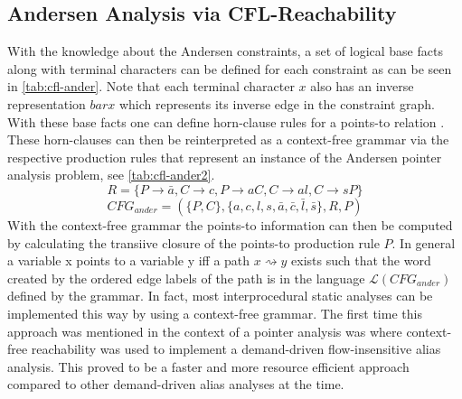 \subsection{Andersen Analysis via CFL-Reachability}\label{sec:ander-cfl}
With the knowledge about the Andersen constraints, a set of logical base facts along with terminal characters can be defined for each constraint as can be seen in \autoref{tab:cfl-ander}. Note that each terminal character $x$ also has an inverse representation $bar{x}$ which represents its inverse edge in the constraint graph.
With these base facts one can define horn-clause rules for a points-to relation \cite{reps1998program}. These horn-clauses can then be reinterpreted as a context-free grammar via the respective production rules that represent an instance of the Andersen pointer analysis problem, see \autoref{tab:cfl-ander2}.
$$R=\{P\rightarrow \bar{a}, C \rightarrow c, P\rightarrow aC, C\rightarrow al, C\rightarrow sP\}$$
$$CFG_{ander}=(\{P,C\}, \{a,c,l,s,\bar{a},\bar{c},\bar{l},\bar{s}\}, R, P)$$
With the context-free grammar the points-to information can then be computed by calculating the transiive closure of the points-to production rule $P$. In general a variable x points to a variable y iff a path $x \rightsquigarrow y$ exists such that the word created by the ordered edge labels of the path is in the language $\mathcal{L}(CFG_{ander})$ defined by the grammar.
In fact, most interprocedural static analyses can be implemented this way by using a context-free grammar.
The first time this approach was mentioned in the context of a pointer analysis was \cite{zheng2008demand} where context-free reachability was used to implement a demand-driven flow-insensitive alias analysis.
This proved to be a faster and more resource efficient approach compared to other demand-driven alias analyses at the time.
